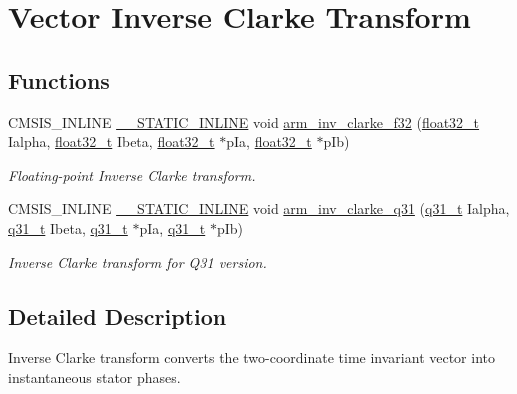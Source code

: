 \hypertarget{group__inv__clarke}{}\section{Vector Inverse Clarke Transform}
\label{group__inv__clarke}
\subsection*{Functions}
\begin{DoxyCompactItemize}
\item 
C\+M\+S\+I\+S\+\_\+\+I\+N\+L\+I\+NE \mbox{\hyperlink{cmsis__iccarm_8h_aba87361bfad2ae52cfe2f40c1a1dbf9c}{\+\_\+\+\_\+\+S\+T\+A\+T\+I\+C\+\_\+\+I\+N\+L\+I\+NE}} void \mbox{\hyperlink{group__inv__clarke_ga945eb24e625a57c7c3be8a6e655646e3}{arm\+\_\+inv\+\_\+clarke\+\_\+f32}} (\mbox{\hyperlink{arm__math_8h_a4611b605e45ab401f02cab15c5e38715}{float32\+\_\+t}} Ialpha, \mbox{\hyperlink{arm__math_8h_a4611b605e45ab401f02cab15c5e38715}{float32\+\_\+t}} Ibeta, \mbox{\hyperlink{arm__math_8h_a4611b605e45ab401f02cab15c5e38715}{float32\+\_\+t}} $\ast$p\+Ia, \mbox{\hyperlink{arm__math_8h_a4611b605e45ab401f02cab15c5e38715}{float32\+\_\+t}} $\ast$p\+Ib)
\begin{DoxyCompactList}\small\item\em Floating-\/point Inverse Clarke transform. \end{DoxyCompactList}\item 
C\+M\+S\+I\+S\+\_\+\+I\+N\+L\+I\+NE \mbox{\hyperlink{cmsis__iccarm_8h_aba87361bfad2ae52cfe2f40c1a1dbf9c}{\+\_\+\+\_\+\+S\+T\+A\+T\+I\+C\+\_\+\+I\+N\+L\+I\+NE}} void \mbox{\hyperlink{group__inv__clarke_ga50768ebd8b71e8988dbb804cc03a742d}{arm\+\_\+inv\+\_\+clarke\+\_\+q31}} (\mbox{\hyperlink{arm__math_8h_adc89a3547f5324b7b3b95adec3806bc0}{q31\+\_\+t}} Ialpha, \mbox{\hyperlink{arm__math_8h_adc89a3547f5324b7b3b95adec3806bc0}{q31\+\_\+t}} Ibeta, \mbox{\hyperlink{arm__math_8h_adc89a3547f5324b7b3b95adec3806bc0}{q31\+\_\+t}} $\ast$p\+Ia, \mbox{\hyperlink{arm__math_8h_adc89a3547f5324b7b3b95adec3806bc0}{q31\+\_\+t}} $\ast$p\+Ib)
\begin{DoxyCompactList}\small\item\em Inverse Clarke transform for Q31 version. \end{DoxyCompactList}\end{DoxyCompactItemize}


\subsection{Detailed Description}
Inverse Clarke transform converts the two-\/coordinate time invariant vector into instantaneous stator phases.

